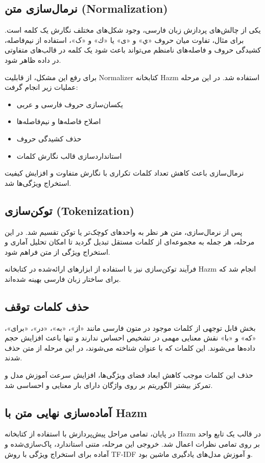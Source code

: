  \subsection{نرمال‌سازی متن (Normalization)}
 یکی از چالش‌های پردازش زبان فارسی، وجود شکل‌های مختلف نگارش یک کلمه است. برای مثال، تفاوت میان حروف «ي» و «ی» یا «ك» و «ک»، استفاده از نیم‌فاصله، کشیدگی حروف و فاصله‌های نامنظم می‌تواند باعث شود یک کلمه در قالب‌های متفاوتی در داده ظاهر شود.
 
 برای رفع این مشکل، از قابلیت Normalizer کتابخانه Hazm استفاده شد. در این مرحله عملیات زیر انجام گرفت:
 \begin{itemize}
 	\item یکسان‌سازی حروف فارسی و عربی
 	\item اصلاح فاصله‌ها و نیم‌فاصله‌ها
 	\item حذف کشیدگی حروف
 	\item استانداردسازی قالب نگارش کلمات
 \end{itemize}
 نرمال‌سازی باعث کاهش تعداد کلمات تکراری با نگارش متفاوت و افزایش کیفیت استخراج ویژگی‌ها شد.
 \subsection{توکن‌سازی (Tokenization)}
 پس از نرمال‌سازی، متن هر نظر به واحدهای کوچک‌تر یا توکن تقسیم شد. در این مرحله، هر جمله به مجموعه‌ای از کلمات مستقل تبدیل گردید تا امکان تحلیل آماری و استخراج ویژگی از متن فراهم شود.
 
 فرآیند توکن‌سازی نیز با استفاده از ابزارهای ارائه‌شده در کتابخانه Hazm انجام شد که برای ساختار زبان فارسی بهینه شده‌اند.
 \subsection{حذف کلمات توقف }
 بخش قابل توجهی از کلمات موجود در متون فارسی مانند «از»، «به»، «در»، «برای»، «که» و «با» نقش معنایی مهمی در تشخیص احساس ندارند و تنها باعث افزایش حجم داده‌ها می‌شوند. این کلمات که با عنوان  شناخته می‌شوند، در این مرحله از متن حذف شدند.
 
 حذف این کلمات موجب کاهش ابعاد فضای ویژگی‌ها، افزایش سرعت آموزش مدل و تمرکز بیشتر الگوریتم بر روی واژگان دارای بار معنایی و احساسی شد.
 \subsection{آماده‌سازی نهایی متن با Hazm}
 در پایان، تمامی مراحل پیش‌پردازش با استفاده از کتابخانه Hazm در قالب یک تابع واحد بر روی تمامی نظرات اعمال شد. خروجی این مرحله، متنی استاندارد، پاک‌سازی‌شده و آماده برای استخراج ویژگی با روش TF-IDF و آموزش مدل‌های یادگیری ماشین بود.
 

